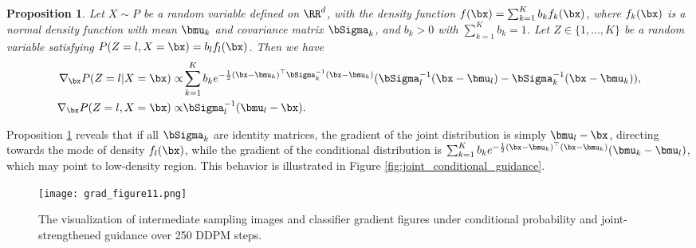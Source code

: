 \documentclass{article}
\newtheorem{proposition}[theorem]{Proposition}
\theoremstyle{definition}
\begin{document}
\begin{proposition}\label{thm_GM}
    Let $X\sim P$ be a random variable defined on $\RR^d$, with the density function $f(\bx) = \sum_{k=1}^K b_k f_k(\bx)$, where $f_k(\bx)$ is a normal density function with mean $\bmu_k$ and covariance matrix $\bSigma_k$, and $b_k>0$ with $\sum_{k=1}^K b_k = 1$. Let $Z\in \{1,...,K\}$ be a random variable satisfying $P(Z=l,X = \bx) = b_lf_l(\bx)$. Then we have
    \begin{align*}
        \nabla_{\bx} P(Z=l|X = \bx) \propto & \sum_{k=1}^Kb_ke^{-\frac{1}{2}(\bx-\bmu_k)^\top\bSigma_k^{-1}(\bx-\bmu_k)}(\bSigma_l^{-1}(\bx-\bmu_l) - \bSigma_k^{-1}(\bx-\bmu_k)),\nonumber\\
         \nabla_{\bx} P(Z=l, X = \bx) \propto & \bSigma_l^{-1}(\bmu_l - \bx).
    \end{align*}
\end{proposition}

Proposition \ref{thm_GM} reveals that if all $\bSigma_k$ are identity matrices, the gradient of the joint distribution is simply $\bmu_l - \bx$, directing towards the mode of density $f_l(\bx)$, while the gradient of the conditional distribution is $\sum_{k=1}^Kb_ke^{-\frac{1}{2}(\bx-\bmu_k)^\top(\bx-\bmu_k)}(\bmu_k - \bmu_l)$, which may point to low-density region. This behavior is illustrated in Figure \ref{fig:joint_conditional_guidance}.

\begin{figure}[h]
  \centering
\texttt{[image: grad\_figure11.png]}
  \caption{The visualization of intermediate sampling images and classifier gradient figures under conditional probability and joint-strengthened guidance over 250 DDPM steps.}
  \label{fig:grad_figure1}
\end{figure} 
\end{document}
